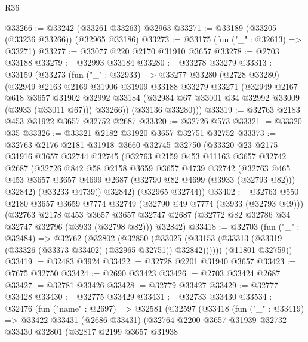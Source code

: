 \begin{lexlean}{R36}
\begin{coremodule}
@33266 := @33242 (@33261 @33263) @32963
@33271 := @33189 (@33205 (@33236 @33266)) (@32965 @33186)
@33273 := @33175 (fun ("_" : @32613) => @33271)
@33277 := @33077 @220 @2170 @31910 @3657
@33278 := @2703 @33188
@33279 := @32993 @33184
@33280 := @33278 @33279
@33313 := @33159
    (@33273
      (fun ("_" : @32933) =>
      @33277
        @33280
        (@2728 @33280)
        (@32949
          @2163
          @2169
          @31906
          @31909
          @33188
          @33279
          @33271
          (@32949
            @2167
            @618
            @3657
            @31902
            @32992
            @33184
            (@32984 @67 @33001 @34 @32992 @33009 (@3933 (@33011 @67)))
            @33266))
        (@33136 @33280)))
@33319 := @32763 @2183 @453 @31922 @3657 @32752 @2687
@33320 := @32726 @573
@33321 := @33320 @35
@33326 := @33321 @2182 @31920 @3657 @32751 @32752
@33373 := @32763
    @2176
    @2181
    @31918
    @3660
    @32745
    @32750
    (@33320
      @23
      @2175
      @31916
      @3657
      @32744
      @32745
      (@32763
        @2159
        @453
        @11163
        @3657
        @32742
        @2687
        (@32726
          @842
          @58
          @2158
          @3659
          @3657
          @4739
          @32742
          (@32763 @465 @453 @3657 @3657 @4699 @2687 (@32790 @82 @4699 (@3933 (@32793 @82))) @32842)
          (@33233 @4739))
        @32842)
      (@32965 @32744))
@33402 := @32763
    @550
    @2180
    @3657
    @3659
    @7774
    @32749
    (@32790 @49 @7774 (@3933 (@32793 @49)))
    (@32763
      @2178
      @453
      @3657
      @3657
      @32747
      @2687
      (@32772 @82 @32786 @34 @32747 @32796 (@3933 (@32798 @82)))
      @32842)
@33418 := @32703
    (fun ("_" : @32484) =>
    @32762
      (@32802
        (@32850
          (@33025 (@33153 (@33313 (@33319 (@33326 (@33373 @33402) (@32965 @32751)) @32842))))))
      (@11801 @32759))
@33419 := @32483 @3924
@33422 := @32728 @2201 @31940 @3657
@33423 := @7675 @32750
@33424 := @2690 @33423
@33426 := @2703 @33424 @2687
@33427 := @32781 @33426
@33428 := @32779 @33427
@33429 := @32777 @33428
@33430 := @32775 @33429
@33431 := @32733 @33430
@33534 := @32476
    (fun ("name" : @2697) =>
    @32581
      (@32597
        (@33418
          (fun ("_" : @33419) =>
          @33422
            @33431
            (@2686 @33431)
            (@32764
              @2200
              @3657
              @31939
              @32732
              @33430
              @32801
              (@32817
                @2199
                @3657
                @31938

\end{coremodule}
\end{lexlean}
